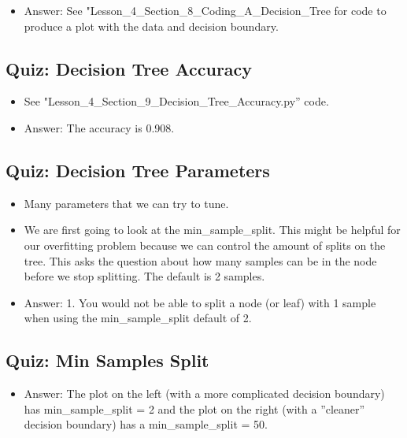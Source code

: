 \documentclass[12pt]{report}
\begin{document}
\begin{itemize}

\item Answer: See "Lesson\_4\_Section\_8\_Coding\_A\_Decision\_Tree for code to produce a plot with the data and decision boundary. 

\end{itemize}

\subsection{Quiz: Decision Tree Accuracy}

\begin{itemize}

\item See "Lesson\_4\_Section\_9\_Decision\_Tree\_Accuracy.py'' code. 

\item Answer: The accuracy is 0.908.

\end{itemize}

\subsection{Quiz: Decision Tree Parameters}

\begin{itemize}

\item Many parameters that we can try to tune. 

\item We are first going to look at the min\_sample\_split. This might be helpful for our overfitting problem because we can control the amount of splits on the tree. This asks the question about how many samples can be in the node before we stop splitting. The default is 2 samples. 

\item Answer: 1. You would not be able to split a node (or leaf) with 1 sample when using the min\_sample\_split default of 2. 

\end{itemize}

\subsection{Quiz: Min Samples Split}

\begin{itemize}

\item Answer: The plot on the left (with a more complicated decision boundary) has min\_sample\_split = 2 and the plot on the right (with a ''cleaner'' decision boundary) has a  min\_sample\_split = 50. 

\end{itemize}
\end{document}
